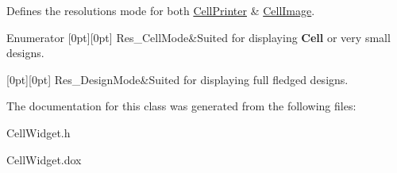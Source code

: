 Defines the resolutions mode for both \hyperlink{classHurricane_1_1CellPrinter}{Cell\+Printer} \& \hyperlink{classHurricane_1_1CellImage}{Cell\+Image}. \begin{DoxyEnumFields}{Enumerator}
[0pt][0pt]{}\mbox{\label{classHurricane_1_1CellWidget_a4b81fed78775d491c169b649870d9dd7af37fd1c10fd363f0ad04a94dbccd5789}} 
Res\+\_\+\+Cell\+Mode&Suited for displaying \textbf{ Cell} or very small designs. \\
\hline

[0pt][0pt]{}\mbox{\label{classHurricane_1_1CellWidget_a4b81fed78775d491c169b649870d9dd7a0c7c9bd939930fe178b5b8bcd84bdc1e}} 
Res\+\_\+\+Design\+Mode&Suited for displaying full fledged designs. \\
\hline

\end{DoxyEnumFields}


The documentation for this class was generated from the following files\+:\begin{DoxyCompactItemize}
\item 
Cell\+Widget.\+h\item 
Cell\+Widget.\+dox\end{DoxyCompactItemize}
